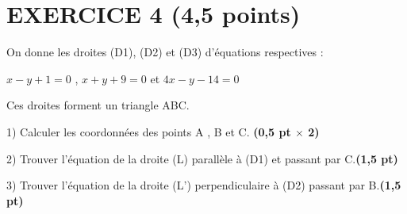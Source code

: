 \documentclass{article}
\begin{document}
\section*{EXERCICE 4 (4,5 points)}
On donne les droites (D1), (D2) et (D3) d’équations respectives :

\( x - y + 1 =0\) ,  \(x + y + 9 = 0\) et  	 \(4x - y - 14 = 0\)

    Ces droites forment un triangle ABC. 
    
    1) Calculer les coordonnées des points A , B et C. \textbf{(0,5 pt $\times$ 2)}
    
    2) Trouver l’équation de la droite (L) parallèle à (D1) et passant par C.\textbf{(1,5 pt)}
    
    3) Trouver l’équation de la droite (L’) perpendiculaire à (D2) passant par B.\textbf{(1,5 pt)}
    
\end{document}

